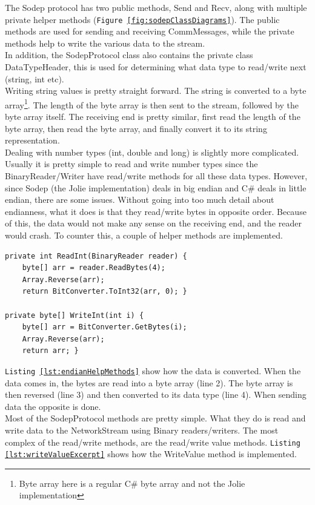 \documentclass[12pt,a4paper]{article}
\begin{document}
The Sodep protocol has two public methods, Send and Recv, along with multiple private helper methods (\texttt{Figure \ref{fig:sodepClassDiagrams}}). The public methods are used for sending and receiving CommMessages, while the private methods help to write the various data to the stream.\\
In addition, the SodepProtocol class also contains the private class DataTypeHeader, this is used for determining what data type to read/write next (string, int etc).\\
Writing string values is pretty straight forward. The string is converted to a byte array\footnote{Byte array here is a regular C\# byte array and not the Jolie implementation}. The length of the byte array is then sent to the stream, followed by the byte array itself. The receiving end is pretty similar, first read the length of the byte array, then read the byte array, and finally convert it to its string representation.\\
Dealing with number types (int, double and long) is slightly more complicated. Usually it is pretty simple to read and write number types since the BinaryReader/Writer have read/write methods for all these data types. However, since Sodep (the Jolie implementation) deals in big endian\cite{endian_definition} and C\# deals in little endian, there are some issues. Without going into too much detail about endianness, what it does is that they read/write bytes in opposite order. Because of this, the data would not make any sense on the receiving end, and the reader would crash. To counter this, a couple of helper methods are implemented.

\newpage
\begin{lstlisting}[caption={Little- big endian Int32 converter method},label={lst:endianHelpMethods}]
private int ReadInt(BinaryReader reader) {
	byte[] arr = reader.ReadBytes(4);
	Array.Reverse(arr);
	return BitConverter.ToInt32(arr, 0); }
 
private byte[] WriteInt(int i) {
	byte[] arr = BitConverter.GetBytes(i);
	Array.Reverse(arr);
	return arr; }
\end{lstlisting}

\texttt{Listing \ref{lst:endianHelpMethods}} show how the data is converted. When the data comes in, the bytes are read into a byte array (line 2). The byte array is then reversed (line 3) and then converted to its data type (line 4). When sending data the opposite is done.\\

Most of the SodepProtocol methods are pretty simple. What they do is read and write data to the NetworkStream using Binary readers/writers. The most complex of the read/write methods, are the read/write value methods. \texttt{Listing \ref{lst:writeValueExcerpt}} shows how the WriteValue method is implemented.
\end{document}
